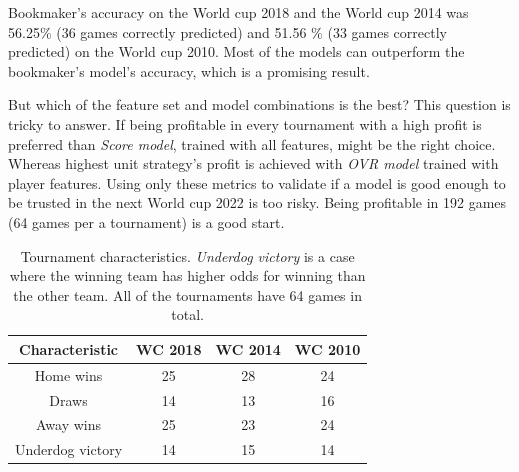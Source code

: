 Bookmaker's accuracy on the World cup 2018 and the World cup 2014 was 56.25\% (36 games correctly predicted) and 51.56  \% (33 games correctly predicted) on the World cup 2010. Most of the models can outperform the bookmaker's model's accuracy, which is a promising result.

But which of the feature set and model combinations is the best? This question is tricky to answer. If being profitable in every tournament with a high profit is preferred than \textit{Score model}, trained with all features, might be the right choice. Whereas highest unit strategy's profit is achieved with \textit{OVR model} trained with player features. Using only these metrics to validate if a model is good enough to be trusted in the next World cup 2022 is too risky. Being profitable in 192 games (64 games per a tournament) is a good start.

\begin{table}
    \caption{Tournament characteristics. \textit{Underdog victory} is a case where the winning team has higher odds for winning than the other team. All of the tournaments have 64 games in total.}
    \begin{tabular}{| c | c|c | c|}
        \hline
        Characteristic & \textbf{WC 2018} & \textbf{WC 2014} & \textbf{WC 2010}\\
        \hline
        Home wins & 25 & 28 & 24\\
        Draws & 14 & 13 & 16\\
        Away wins & 25 & 23 & 24\\
        Underdog victory  & 14 & 15 & 14\\
        \hline
    \end{tabular}
    \label{table:tournamentcharacteristics}
\end{table}


